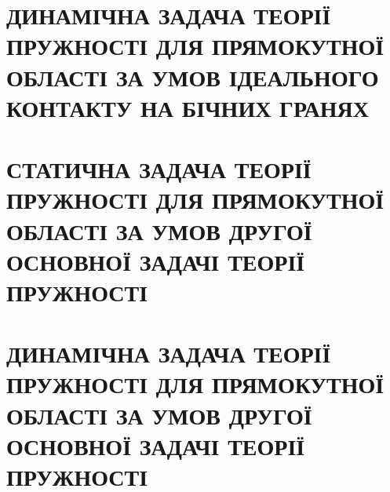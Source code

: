 \documentclass[a4paper,14pt]{extarticle}
\numberwithin{equation}{section}
\begin{document}
\section{ДИНАМІЧНА ЗАДАЧА ТЕОРІЇ ПРУЖНОСТІ ДЛЯ ПРЯМОКУТНОЇ ОБЛАСТІ
ЗА УМОВ ІДЕАЛЬНОГО КОНТАКТУ НА БІЧНИХ ГРАНЯХ}

\newpage

\section{СТАТИЧНА ЗАДАЧА ТЕОРІЇ ПРУЖНОСТІ ДЛЯ ПРЯМОКУТНОЇ ОБЛАСТІ
ЗА УМОВ ДРУГОЇ ОСНОВНОЇ ЗАДАЧІ ТЕОРІЇ ПРУЖНОСТІ}

\newpage

\section{ДИНАМІЧНА ЗАДАЧА ТЕОРІЇ ПРУЖНОСТІ ДЛЯ ПРЯМОКУТНОЇ ОБЛАСТІ
ЗА УМОВ ДРУГОЇ ОСНОВНОЇ ЗАДАЧІ ТЕОРІЇ ПРУЖНОСТІ}

\newpage
\end{document}
